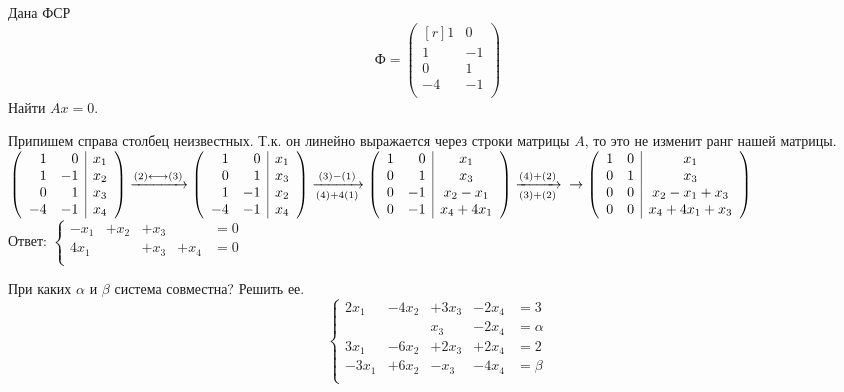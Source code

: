 \begin{prim}
	Дана ФСР
	$$
	\text{Ф}=
	\begin{pmatrix*}[r]
	1&0\\
	1&-1\\
	0&1\\
	-4&-1\\
	\end{pmatrix*}
	$$
	Найти $Ax=0$.
\end{prim}
Припишем справа столбец неизвестных. Т.к. он линейно выражается через строки матрицы $A$, то это не изменит ранг нашей матрицы.\\
$
\left( \begin{array}{rr|c}
1&0&x_1\\
1&-1&x_2\\
0&1&x_3\\
-4&-1&x_4\\
\end{array}\right)
\xrightarrow{(2)\longleftrightarrow(3)}
\left( \begin{array}{rr|c}
1&0&x_1\\
0&1&x_3\\
1&-1&x_2\\
-4&-1&x_4\\
\end{array}\right)
\xrightarrow[(4)+4(1)]{(3)-(1)}
\left( \begin{array}{rr|c}
1&0&x_1\\
0&1&x_3\\
0&-1&x_2-x_1\\
0&-1&x_4+4x_1\\
\end{array}\right)
\xrightarrow[(3)+(2)]{(4)+(2)}\\
\rightarrow
\left( \begin{array}{rr|c}
1&0&x_1\\
0&1&x_3\\
0&0&x_2-x_1+x_3\\
0&0&x_4+4x_1+x_3\\
\end{array}\right)
$\\
Ответ: $\left\{ \begin{array}{rrrrl}
	-x_1&+x_2&+x_3&&=0\\
	4x_1&&+x_3&+x_4&=0\\
\end{array}
\right.$
\begin{prim}
	При каких $\alpha$ и $\beta$ система совместна? Решить ее.
	$$\left\{ \begin{array}{rrrrl}
	2x_1&-4x_2&+3x_3&-2x_4&=3\\
	&&x_3&-2x_4&=\alpha\\
	3x_1&-6x_2&+2x_3&+2x_4&=2\\
	-3x_1&+6x_2&-x_3&-4x_4&=\beta\\
	\end{array}
	\right.$$
\end{prim}

